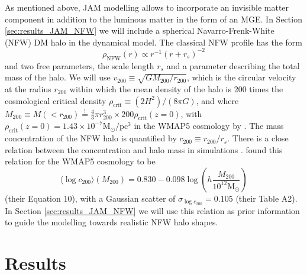 \documentclass[useAMS,usenatbib]{mnras}
\begin{document}
As mentioned above, JAM modelling allows to incorporate an invisible matter component in addition to the luminous matter in the form of an MGE. In Section \ref{sec:results_JAM_NFW} we will include a spherical Navarro-Frenk-White (NFW) DM halo \citep{1996ApJ...462..563N} in the dynamical model. The classical NFW profile has the form
\begin{equation}
\rho_\text{NFW}(r) \propto r^{-1} \left( r+r_s \right)^{-2} \label{eq:NFWprofile}
\end{equation}
and two free parameters, the scale length $r_s$ and a parameter describing the total mass of the halo. We will use $v_\text{200}\equiv \sqrt{GM_{200}/r_{200}}$, which is the circular velocity at the radius $r_\text{200}$ within which the mean density of the halo is 200 times the cosmological critical density $\rho_\text{crit} \equiv (2H^2)/(8\pi G)$, and where $M_{200} \equiv M(<r_{200}) \stackrel{!}{=} \frac 43 \pi r_{200}^3 \times 200\rho_\text{crit}(z=0)$, with $\rho_\text{crit}(z=0)=1.43 \times 10^{-7} \text{M}_\odot / \text{pc}^3$ in the WMAP5 cosmology by \citet{WMAP5cosm}.
The mass concentration of the NFW halo is quantified by $c_{200}\equiv r_{200} / r_s$.
There is a close relation between the concentration and halo mass in simulations \citep{1996ApJ...462..563N}. \citet{Maccio08} found this relation for the WMAP5 cosmology to be
\begin{equation}
\langle \log c_{200} \rangle (M_{200}) = 0.830 - 0.098 \log \left(h \frac{M_{200}}{10^{12} \text{M}_\odot} \right) \label{eq:Maccio08}
\end{equation}
(their Equation 10), with a Gaussian scatter of $\sigma_{\log c_{200}} = 0.105$ (their Table A2). In Section \ref{sec:results_JAM_NFW} we will use this relation as prior information to guide the modelling towards realistic NFW halo shapes.

\section{Results} \label{sec:Results}
\end{document}
